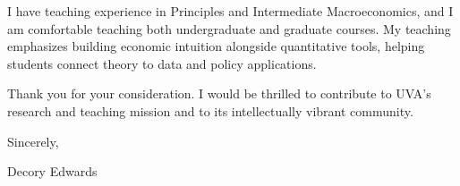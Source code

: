\documentclass[11pt]{letter}
\begin{document}
\begin{letter}{}
I have teaching experience in Principles and Intermediate Macroeconomics, and I am comfortable teaching both undergraduate and graduate courses. My teaching emphasizes building economic intuition alongside quantitative tools, helping students connect theory to data and policy applications.

Thank you for your consideration. I would be thrilled to contribute to UVA’s research and teaching mission and to its intellectually vibrant community.

\closing{Sincerely,}

\vspace{0.5cm}

Decory Edwards

\end{letter}
\end{document}
